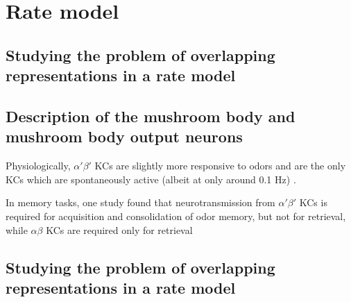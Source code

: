 
  \section{Rate model} 

\subsection*{ Studying the problem of overlapping representations in a rate model}

\subsection*{ Description of the mushroom body and mushroom body output neurons}
Physiologically, $\alpha'\beta'$ KCs are slightly more responsive to odors and are the only KCs which are spontaneously active (albeit at only around 0.1 Hz) \cite{18094099}.

In memory tasks, one study found that neurotransmission from $\alpha'\beta'$ KCs is required for acquisition and consolidation of odor memory, but not for retrieval, while $\alpha\beta$ KCs are required only for retrieval \cite{17196534}

\subsection*{ Studying the problem of overlapping representations in a rate model}
  
  
  
  
  
  
  
  
  
  
  